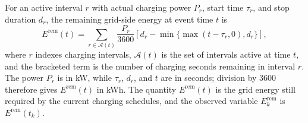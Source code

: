 \documentclass[conference]{IEEEtran}
\begin{document}
For an active interval $r$ with actual charging power $P_r$, start time $\tau_r$, and stop duration $d_r$, the remaining grid-side energy at event time $t$ is
\begin{equation}
 E^{\mathrm{rem}}(t)=\sum_{r\in\mathcal{A}(t)}
 \frac{P_r}{3600}\left[d_r-\min\{\max(t-\tau_r,0),d_r\}\right],
\end{equation}
where $r$ indexes charging intervals, $\mathcal{A}(t)$ is the set of intervals active at time $t$, and the bracketed term is the number of charging seconds remaining in interval $r$. The power $P_r$ is in kW, while $\tau_r$, $d_r$, and $t$ are in seconds; division by 3600 therefore gives $E^{\mathrm{rem}}(t)$ in kWh. The quantity $E^{\mathrm{rem}}(t)$ is the grid energy still required by the current charging schedules, and the observed variable $E^{\mathrm{rem}}_k$ is $E^{\mathrm{rem}}(t_k)$.
\end{document}
